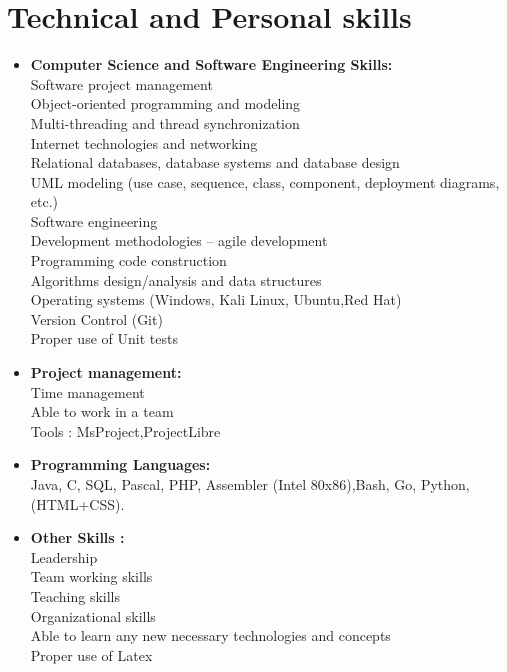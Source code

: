 \documentclass[12pt,a4paper,sans]{moderncv}
\begin{document}
	\section{Technical and Personal skills}
	\vspace{1.5 ex}
	\begin{itemize}
		
		\item \textbf{Computer Science and Software Engineering Skills:}
		\vspace{2ex}
		\\
		Software project management\\
		Object-oriented programming and modeling\\
		Multi-threading and thread synchronization\\
		Internet technologies and networking\\
		Relational databases, database systems and database design\\
		UML modeling (use case, sequence, class, component, deployment diagrams, etc.)\\
		Software engineering\\
		Development methodologies – agile development\\
		Programming code construction\\
		Algorithms design/analysis and data structures\\
		Operating systems  (Windows, Kali Linux, Ubuntu,Red Hat) \\
		Version Control (Git)\\
		Proper use of Unit tests 
		\vspace{3pt}
		\newpage
		\item \textbf{Project management:}
		\vspace{3ex}\\
		Time management\\
		Able to work in a team\\
		Tools : MsProject,ProjectLibre
		\vspace{3ex}
		\item \textbf{Programming Languages:}
		\vspace{3ex}
		\\ Java,  C, SQL, Pascal, PHP,  Assembler (Intel 80x86),Bash, Go, Python,(HTML+CSS).
		\vspace{3ex}
		\item \textbf{	Other Skills :} 
		\vspace{3ex}
		\\
		Leadership\\
		Team working skills\\
		Teaching skills\\
		Organizational skills\\
		Able to learn any new necessary technologies and concepts\\
		Proper use of Latex 
		
	\end{itemize}
	
\end{document}
